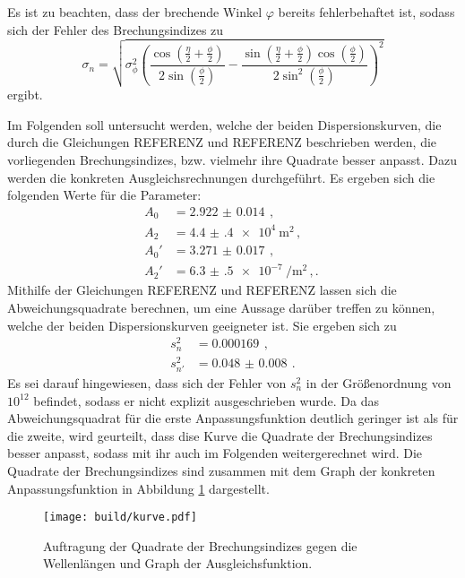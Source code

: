 Es ist zu beachten, dass
der brechende Winkel $\varphi$ bereits fehlerbehaftet ist, sodass sich der Fehler
des Brechungsindizes zu
\begin{equation*}
  \sigma_n = \sqrt{
   \sigma_{\phi}^{2} \left(\frac{\cos{\left (\frac{\eta}{2} + \frac{\phi}{2} \right )}}{2 \sin{\left (\frac{\phi}{2} \right )}} - \frac{\sin{\left (\frac{\eta}{2}
  + \frac{\phi}{2} \right )} \cos{\left (\frac{\phi}{2} \right )}}{2 \sin^{2}{\left (\frac{\phi}{2} \right )}}\right)^{2}}
\end{equation*}
ergibt.

Im Folgenden soll untersucht werden, welche der beiden Dispersionskurven, die durch die
Gleichungen REFERENZ und REFERENZ beschrieben werden, die vorliegenden Brechungsindizes, bzw. vielmehr ihre Quadrate
besser anpasst. Dazu werden die konkreten Ausgleichsrechnungen durchgeführt. Es ergeben sich die
folgenden Werte für die Parameter:
\begin{align*}
  A_0 &= \SI{2.922(14)}{}\,,\\
  A_2 &= \SI{4.4(4)e4}{\meter\squared}\,,\\
  A_0' &= \SI{3.271(17)}{}\,,\\
  A_2' &= \SI{6.3(5)e-7}{\per\meter\squared}\,,.\
\end{align*}
Mithilfe der Gleichungen REFERENZ und REFERENZ lassen sich die Abweichungsquadrate
berechnen, um eine Aussage darüber treffen zu können, welche der beiden Dispersionskurven
geeigneter ist. Sie ergeben sich zu
\begin{align*}
  s_n^2 &= \SI{0.000169}{}\,,\\
  s_{n'}^2 &= \SI{0.048(8)}{}\,.
\end{align*}
Es sei darauf hingewiesen, dass sich der Fehler von $s_n^2$ in der Größenordnung
von $10^{12}$ befindet, sodass er nicht explizit ausgeschrieben wurde.
Da das Abweichungsquadrat für die erste Anpassungsfunktion deutlich geringer ist als für
die zweite, wird geurteilt, dass dise Kurve die Quadrate der Brechungsindizes besser anpasst,
sodass mit ihr auch im Folgenden weitergerechnet wird.
Die Quadrate der Brechungsindizes sind zusammen mit dem Graph der konkreten Anpassungsfunktion
in Abbildung \ref{fig:kurve} dargestellt.

\begin{figure}
  \centering
  \texttt{[image: build/kurve.pdf]}
  \caption{Auftragung der Quadrate der Brechungsindizes gegen die Wellenlängen und Graph der Ausgleichsfunktion.}
  \label{fig:kurve}
\end{figure}

